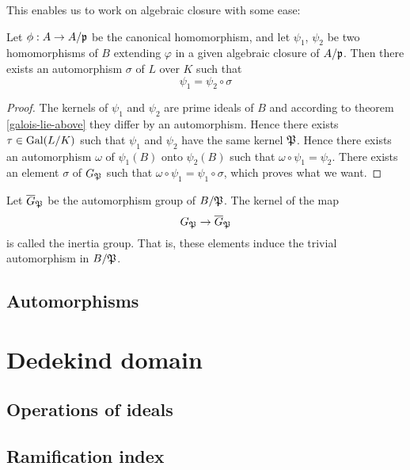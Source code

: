 				This enables us to work on algebraic closure with some ease:
				\begin{corollary}
					Let $\phi:A \to A/\mathfrak{p}$ be the canonical homomorphism, and let $\psi_1$, $\psi_2$ be two homomorphisms of $B$ extending $\varphi$ in a given algebraic closure of $A/\mathfrak{p}$. Then there exists an automorphism $\sigma$ of $L$ over $K$ such that
					\[
						\psi_1 = \psi_2 \circ \sigma
					\]
				\end{corollary}
				\begin{proof}
					The kernels of $\psi_1$ and $\psi_2$ are prime ideals of $B$ and according to theorem \ref{galois-lie-above} they differ by an automorphism. Hence there exists $\tau \in \operatorname{Gal}(L/K)$ such that $\psi_1$ and $\psi_2$ have the same kernel $\mathfrak{P}$. Hence there exists an automorphism $\omega$ of $\psi_1(B)$ onto $\psi_2(B)$ such that $\omega \circ \psi_1 = \psi_2$. There exists an element $\sigma$ of $G_\mathfrak{P}$ such that $\omega \circ \psi_1 = \psi_1 \circ \sigma$, which proves what we want.
				\end{proof}
			
				\begin{definition}
					Let $\overline{G}_\mathfrak{P}$ be the automorphism group of $B/\mathfrak{P}$. The kernel of the map
					\[
						G_\mathfrak{P} \to \overline{G}_\mathfrak{P}
					\]
					is called the inertia group. That is, these elements induce the trivial automorphism in $B/\mathfrak{P}$.
				\end{definition}
		\subsection{Automorphisms}
	\section{Dedekind domain}
	
		\subsection{Operations of ideals}
		\subsection{Ramification index}
		
